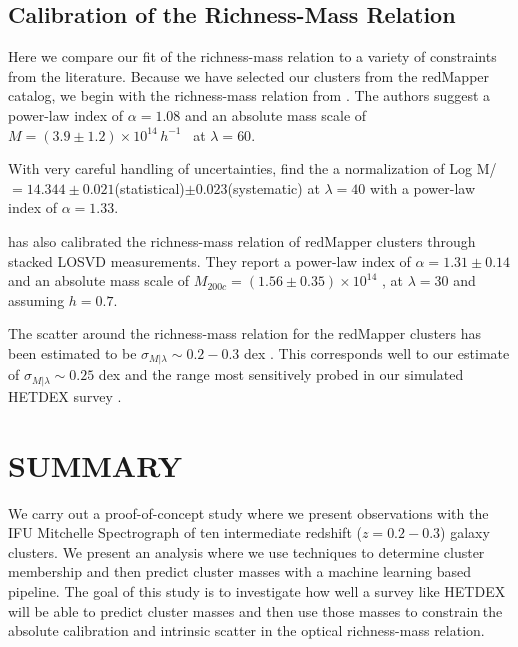 \subsection{Calibration of the Richness-Mass Relation}
Here we compare our fit of the richness-mass relation to a variety of constraints from the literature. Because we have selected our clusters from the redMapper catalog, we begin with the richness-mass relation from \cite{Rykoff2012}. The authors suggest a power-law index of $\alpha=1.08$ and an absolute mass scale of $M=(3.9\pm1.2)\times10^{14}\, h^{-1}$ \Msol\ at $\lambda=60$. 

With very careful handling of uncertainties, \cite{Simet2016} find the a normalization of Log M/\Msol\ $=14.344\pm0.021$(statistical)$\pm0.023$(systematic) at $\lambda=40$ with a power-law index of $\alpha=1.33$.  

\cite{Farahi2016} has also calibrated the richness-mass relation of redMapper clusters through stacked LOSVD measurements. They report a power-law index of $\alpha=1.31\pm0.14$ and an absolute mass scale of $M_{200c} = (1.56\pm0.35)\times10^{14}$ \Msol, at $\lambda=30$ and assuming $h=0.7$. 

The scatter around the richness-mass relation for the redMapper clusters has been estimated to be $\sigma_{M|\lambda} \sim 0.2-0.3$ dex \citep{Rozo2014, Rozo2015}. This corresponds well to our estimate of $\sigma_{M|\lambda} \sim 0.25$ dex and the range most sensitively probed in our simulated HETDEX survey .


\section{SUMMARY}\label{sec:summary}
We carry out a proof-of-concept study where we present observations with the IFU Mitchelle Spectrograph of ten intermediate redshift ($z=0.2-0.3$) galaxy clusters. We present an analysis where we use techniques to determine cluster membership and then predict cluster masses with a machine learning based pipeline. The goal of this study is to investigate how well a survey like HETDEX will be able to predict cluster masses and then use those masses to constrain the absolute calibration and intrinsic scatter in the optical richness-mass relation.


